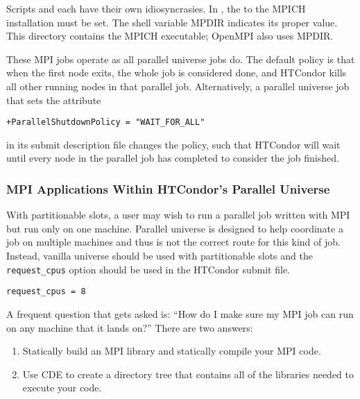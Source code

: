 Scripts  and 
each have their own idiosyncrasies.
In , the  to the MPICH installation must be set.
The shell variable MPDIR indicates its proper value.
This directory contains the MPICH  executable; OpenMPI also
uses MPDIR.

These MPI jobs operate as all parallel universe jobs do.
The default policy is that when the first node exits,
the whole job is considered done, 
and HTCondor kills all other running nodes in that parallel job.
Alternatively, a parallel universe job that sets the attribute
\begin{verbatim}
+ParallelShutdownPolicy = "WAIT_FOR_ALL"
\end{verbatim}
in its submit description file changes the policy,
such that HTCondor will wait until every node in the parallel 
job has completed to consider the job finished. 


\subsubsection{\label{sec:parallel-mpi-submit-single}MPI Applications Within HTCondor's Parallel Universe}

With partitionable slots, a user may wish to run a parallel job written with
MPI but run only on one machine. Parallel universe is designed to help 
coordinate a job on multiple machines and thus is not the correct route for
this kind of job. Instead, vanilla universe should be used with partitionable
slots and the \verb|request_cpus| option should be used in the HTCondor submit
file.

\begin{verbatim}
request_cpus = 8
\end{verbatim}

A frequent question that gets asked is: ``How do I make sure my MPI job can run 
on any machine that it lands on?'' There are two answers:
\begin{enumerate}
\item Statically build an MPI library and statically compile your MPI code.
\item Use CDE to create a directory tree that contains all of the libraries 
needed to execute your code.
\end{enumerate}

